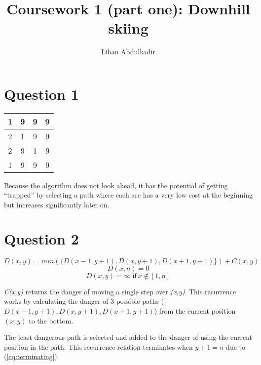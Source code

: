 \documentclass{article}
\begin{document}
\title{Coursework 1 (part one): Downhill skiing}
\author{Liban Abdulkadir}

\maketitle

\section*{Question 1}
\begin{center}
    \begin{tabular}{| c | c | c | c | }
    \hline
    1 & 9 & 9 & 9 \\ \hline
    2 & 1 & 9 & 9 \\ \hline
    2 & 9 & 1 & 9 \\ \hline
    1 & 9 & 9 & 9 \\ \hline
    \end{tabular}
\end{center}
Because the algorithm does not look ahead, it has the potential of getting “trapped” by selecting a path where each arc has a very low cost at the beginning but increases significantly later on.
\section*{Question 2}
\begin{equation}D(x,y) = min(\{D(x-1,y+1),D(x,y+1),D(x+1,y+1)\}) + C(x,y)\end{equation}
\begin{equation}D(x,n) = 0\label{eq:terminating}\end{equation}
\begin{equation}D(x,y) = \infty\;\text{if}\: x \notin [1,n]\end{equation}

\emph{C(x,y)} returns the danger of moving a single step over \emph{(x,y)}.
This recurrence works by calculating the danger of 3 possible paths 
(\begin{math}D(x-1,y+1), D(x,y+1), D(x+1,y+1)\end{math}) from the current position 
\begin{math}(x,y)\end{math} to the bottom.

The least dangerous path is selected and added to the danger of using the current position in the path.
This recurrence relation terminates when \begin{math}y+1 = n\end{math} due to (\ref{eq:terminating}).
\end{document}
